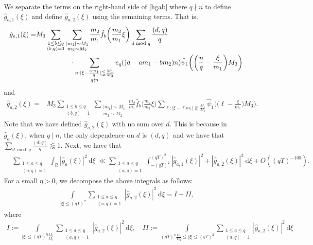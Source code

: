 \documentclass[12pt]{amsart}
\theoremstyle{definition}
\theoremstyle{plain}
\theoremstyle{remark}
\numberwithin{equation}{section}
\numberwithin{theorem}{section}
\numberwithin{equation}{section}
\begin{document}
	We separate the terms on the right-hand side of \eqref{hgab} where $q \nmid n$ to define $\hat{g}_{a, 1}(\xi)$ and define $\hat{g}_{a, 2}(\xi)$ using the remaining terms. That is,
	\begin{align}
		\hat{g}_{a,1}(\xi)=&M_{3}\sum_{\substack{1 \leq b \leq q \\ (b, q)=1}}\sum_{\substack{|m_{1}|\sim M_{1} \\ m_{2}\sim M_{2}}}\frac{m_{2}}{m_{1}}\hat{f}_{b}\bigg(\frac{m_{2}}{m_{1}}\xi\bigg)\sum_{d \bmod q}\frac{(d, q)}{q}
		\notag
		\\
		&\quad\quad\quad\quad\quad\cdot \sum_{\substack{n: |\xi - \frac{nm_{1}}{q}|\lessapprox \frac{M_{1}}{M_{3}} \\ q\nmid n }}e_q((d-am_1-bm_2)n)\hat{\psi}_{1}\bigg(\bigg(\frac{n}{q}-\frac{\xi}{m_{1}}\bigg)M_{3}\bigg) \label{ga1 definition}
	\end{align}
	and 
	\begin{align}
		\hat{g}_{a,2}(\xi)=&M_3\sum_{\substack{1 \leq b \leq q \\ (b, q)=1}}\sum_{\substack{|m_{1}|\sim M_{1} \\ m_{2}\sim M_{2}}} \frac{m_{2}}{m_{1}}\hat{f}_{b}\bigg(\frac{m_{2}}{m_{1}}\xi\bigg) \sum_{\ell: |\xi - \ell m_{1}|\lessapprox \frac{M_{1}}{M_{3}} }\hat{\psi}_{1}\bigg(\bigg(\ell - \frac{\xi}{m_{1}}\bigg)M_{3}\bigg).  \label{ga2 definition}
	\end{align}
	Note that we have defined $\hat{g}_{a,2}(\xi)$ with no sum over $d$. This is because in $\hat{g}_a(\xi)$, when $q \mid n$, the only dependence on $d$ is $(d,q)$ and we have that $\sum_{d \bmod q} \frac{(d,q)}{q} \lessapprox 1$. Next, we have that
	\begin{align*}
		&\sum_{\substack{1 \leq a \leq q \\ (a, q)=1}}\int_{\mathbb{R}}|\hat{g}_{a}(\xi)|^{2}\: \mathrm{d} \xi\
		\ll\sum_{\substack{1 \leq a \leq q \\ (a, q)=1}}\int_{-(qT)^{2}}^{(qT)^{2}}|\hat{g}_{a,1}(\xi)|^{2}+ |\hat{g}_{a,2}(\xi)|^{2}\: \mathrm{d} \xi+O((qT)^{-100}).
	\end{align*}
	For a small $\eta>0$, we decompose the above integrals as follows:
	\begin{align*}
		\int\limits_{|\xi|\leq (qT)^{2}}\sum_{\substack{1 \leq a \leq q \\ (a, q)=1}}|\hat{g}_{a,2}(\xi)|^{2}\: \mathrm{d} \xi = I+II,
	\end{align*}
	where 
	\begin{align*}
		I:=\int\limits_{|\xi|\leq (qT)^{\eta}\frac{M_{1}}{M_{3}}}\sum_{\substack{1 \leq a \leq q \\ (a, q)=1}}|\hat{g}_{a,2}(\xi)|^{2}\: \mathrm{d} \xi, \quad II:=\int\limits_{(qT)^{\eta}\frac{M_{1}}{M_{3}}\leq |\xi|\leq (qT)^{2}}\sum_{\substack{1 \leq a \leq q \\ (a, q)=1}}|\hat{g}_{a,2}(\xi)|^{2}\: \mathrm{d} \xi
	\end{align*}
\end{document}
